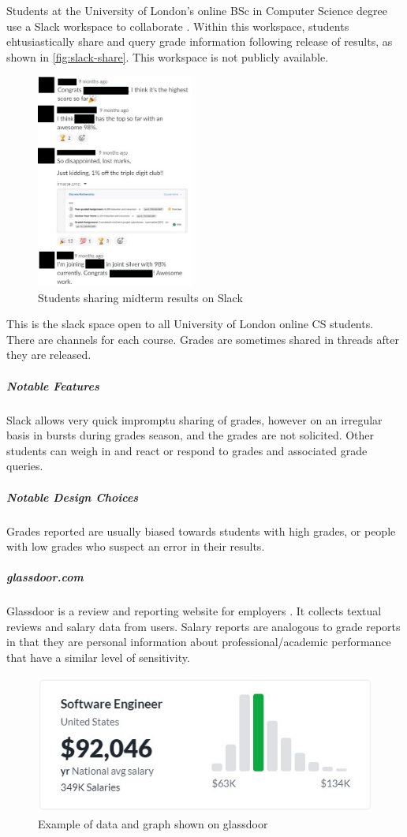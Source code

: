 Students at the University of London's online BSc in Computer Science degree use a Slack workspace to collaborate \cite{slack}. Within this workspace, students ehtusiastically share and query grade information following release of results, as shown in \autoref{fig:slack-share}. This workspace is not publicly available.

\begin{figure}[H]
\noindent \includegraphics[height=200pt]{slack-share}
\centering
\caption{Students sharing midterm results on Slack}
\label{fig:slack-share}
\end{figure}

\noindent This is the slack space open to all University of London online CS students. There are channels for each course. Grades are sometimes shared in threads after they are released.
\bigskip

\subparagraph{Notable Features}
Slack allows very quick impromptu sharing of grades, however on an irregular basis in bursts during grades season, and the grades are not solicited. Other students can weigh in and react or respond to grades and associated grade queries.

\subparagraph{Notable Design Choices}
Grades reported are usually biased towards students with high grades, or people with low grades who suspect an error in their results.

\subparagraph{glassdoor.com}

Glassdoor is a review and reporting website for employers \cite{glassdoor}. It collects textual reviews and salary data from users. Salary reports are analogous to grade reports in that they are personal information about professional/academic performance that have a similar level of sensitivity.

\begin{figure}[H]
\noindent \includegraphics{glassdoor1}
\centering
\caption{Example of data and graph shown on glassdoor}
\label{fig:glassdoor-data}
\end{figure}

